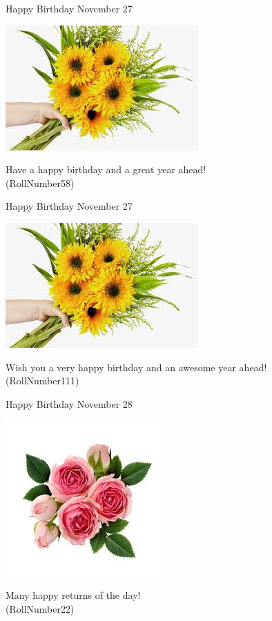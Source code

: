 \documentclass[table, landscape]{beamer}
\begin{document}
\begin{frame}{\color{red}Happy Birthday }
{November 27}
\begin{center}
\includegraphics[height=0.5\textheight]{flowers/f6.jpeg}

Have a happy birthday and a great year ahead! \\ \vspace{0.5cm}{\Large name51} (RollNumber58)
\end{center}
\end{frame}
\begin{frame}{\color{red}Happy Birthday }
{November 27}
\begin{center}
\includegraphics[height=0.5\textheight]{flowers/f6.jpeg}

Wish you a very happy birthday and an awesome year ahead! \\ \vspace{0.5cm}{\Large name104} (RollNumber111)
\end{center}
\end{frame}
\begin{frame}{\color{red}Happy Birthday }
{November 28}
\begin{center}
\includegraphics[height=0.5\textheight]{flowers/f5.jpeg}

Many happy returns of the day! \\ \vspace{0.5cm}{\Large name17} (RollNumber22)
\end{center}
\end{frame}
\end{document}
